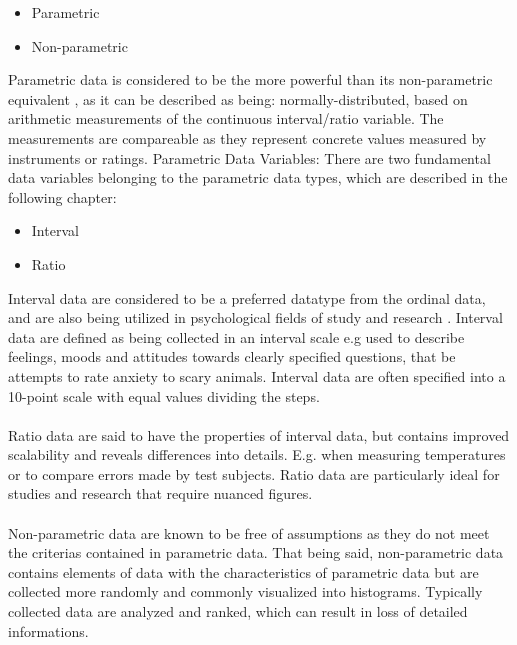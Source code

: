 \begin{itemize}
\item Parametric
\item Non-parametric
\end{itemize}
Parametric data is considered to be the more powerful than its non-parametric equivalent \citep[page 21]{Design}, as it can be described as being: normally-distributed, based on arithmetic measurements of the continuous interval/ratio variable. The measurements are compareable as they represent concrete values measured by instruments or ratings.
Parametric Data Variables:
There are two fundamental data variables belonging to the parametric data types, which are described in the following chapter:
\begin{itemize}
\item Interval
\item Ratio 
\end{itemize}
Interval data are considered to be a preferred datatype from the ordinal data, and are also being utilized in psychological fields of study and research \citep[page 8]{Design}. Interval data are defined as being collected in an interval scale e.g used to describe feelings, moods and attitudes towards clearly specified questions, that be attempts to rate anxiety to scary animals. Interval data are often specified into a 10-point scale with equal values dividing the steps.\\\\
Ratio data are said to have the properties of interval data, but contains improved scalability and reveals differences into details. E.g. when measuring temperatures or to compare errors made by test subjects. Ratio data are particularly ideal for studies and research that require nuanced figures.\\\\
Non-parametric data are known to be free of assumptions as they do not meet the criterias contained in parametric data. That being said, non-parametric data contains elements of data with the characteristics of parametric data but are collected more randomly and commonly visualized into histograms. Typically collected data are analyzed and ranked, which can result in loss of detailed informations. 
